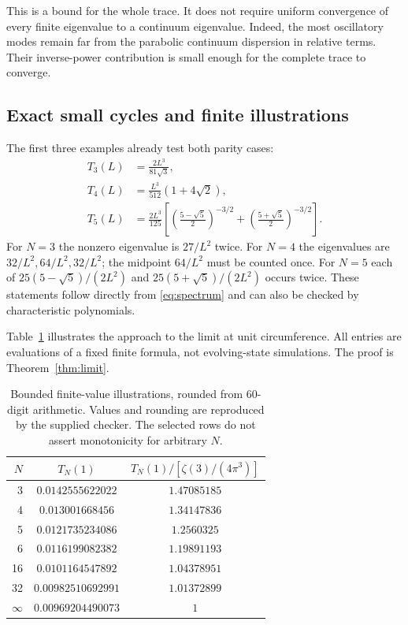 \documentclass[11pt,a4paper]{article}
\theoremstyle{definition}\newtheorem{definition}[theorem]{Definition}
\theoremstyle{remark}\newtheorem{remark}[theorem]{Remark}
\numberwithin{equation}{section}
\begin{document}
This is a bound for the whole trace. It does not require uniform
convergence of every finite eigenvalue to a continuum eigenvalue.
Indeed, the most oscillatory modes remain far from the parabolic
continuum dispersion in relative terms. Their inverse-power contribution
is small enough for the complete trace to converge.

\subsection{Exact small cycles and finite illustrations}
The first three examples already test both parity cases:
\begin{align}
 T_3(L)&=\frac{2L^3}{81\sqrt3}, \label{eq:t3}\\
 T_4(L)&=\frac{L^3}{512}(1+4\sqrt2), \label{eq:t4}\\
 T_5(L)&=\frac{2L^3}{125}
 \left[\left(\frac{5-\sqrt5}{2}\right)^{-3/2}
      +\left(\frac{5+\sqrt5}{2}\right)^{-3/2}\right].
 \label{eq:t5}
\end{align}
For \(N=3\) the nonzero eigenvalue is \(27/L^2\) twice.
For \(N=4\) the eigenvalues are \(32/L^2,64/L^2,32/L^2\);
the midpoint \(64/L^2\) must be counted once.
For \(N=5\) each of \(25(5-\sqrt5)/(2L^2)\) and
\(25(5+\sqrt5)/(2L^2)\) occurs twice.
These statements follow directly from \eqref{eq:spectrum} and can also be
checked by characteristic polynomials.

Table~\ref{tab:finite} illustrates the approach to the limit at unit
circumference. All entries are evaluations of a fixed finite formula, not
evolving-state simulations. The proof is Theorem~\ref{thm:limit}.
\begin{table}[ht]
\centering
\begin{tabular}{rcc}
\toprule
\(N\)& \(T_N(1)\) & \(T_N(1)/[\zeta(3)/(4\pi^3)]\)\\
\midrule
3 & \(0.0142555622022\) & \(1.47085185\)\\
4 & \(0.013001668456\) & \(1.34147836\)\\
5 & \(0.0121735234086\) & \(1.2560325\)\\
6 & \(0.0116199082382\) & \(1.19891193\)\\
16 & \(0.0101164547892\) & \(1.04378951\)\\
32 & \(0.00982510692991\) & \(1.01372899\)\\
\(\infty\)& \(0.00969204490073\) & \(1\)\\
\bottomrule
\end{tabular}
\caption{Bounded finite-value illustrations, rounded from 60-digit
arithmetic. Values and rounding are reproduced by the supplied checker.
The selected rows do not assert monotonicity for arbitrary \(N\).}
\label{tab:finite}
\end{table}
\end{document}
